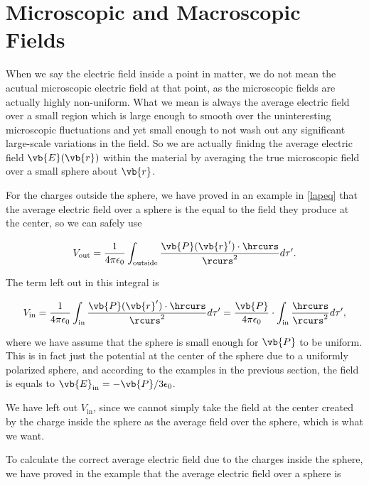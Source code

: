 \documentclass[english,a4paper,12pt]{report}
\begin{document}
\section{Microscopic and Macroscopic Fields}

When we say the electric field inside a point in matter, we do not mean the acutual microscopic electric field at that point, as the microscopic fields are actually highly non-uniform. What we mean is always the average electric field over a small region which is large enough to smooth over the uninteresting microscopic fluctuations and yet small enough to not wash out any significant large-scale variations in the field. So we are actually finidng the average electric field \(\vb{E} (\vb{r} )\) within the material by averaging the true microscopic field over a small sphere about \(\vb{r} \).

For the charges outside the sphere, we have proved in an example in \cref{lapeq} that the average electric field over a sphere is the equal to the field they produce at the center, so we can safely use

\begin{equation}
    V_{\text{out} } = \frac{1}{4\pi \epsilon_0} \int_{\text{outside} }^{} \frac{\vb{P} (\vb{r} ') \cdot \hrcurs }{\rcurs ^2} d\tau '.   
\end{equation}

The term left out in this integral is 

\begin{equation}
    V_{\text{in} } = \frac{1}{4\pi \epsilon_0} \int_{\text{in} }^{} \frac{\vb{P} (\vb{r} ') \cdot \hrcurs }{\rcurs ^2} d\tau ' = \frac{\vb{P} }{4\pi \epsilon_0} \cdot \int_{\text{in} }^{} \frac{\hrcurs }{\rcurs ^2}d\tau ',    
\end{equation}

where we have assume that the sphere is small enough for \(\vb{P} \) to be uniform. This is in fact just the potential at the center of the sphere due to a uniformly polarized sphere, and according to the examples in the previous section, the field is equals to \(\vb{E} _{\text{in} } = -\vb{P} /3 \epsilon_0  \). 

We have left out \(V_{\text{in} } \), since we cannot simply take the field at the center created by the charge inside the sphere as the average field over the sphere, which is what we want.

To calculate the correct average electric field due to the charges inside the sphere, we have proved in the example that the average electric field over a sphere is 
\end{document}

